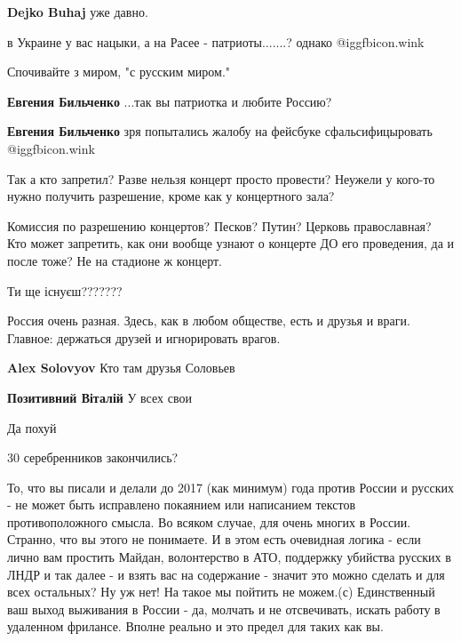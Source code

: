 \begin{itemize}
\begin{itemize}
\textbf{Dejko Buhaj} уже давно.

в Украине у вас нацыки, а на Расее - патриоты.......? однако  @igg{fbicon.wink} 

Спочивайте з миром, "с русским миром."

\textbf{Евгения Бильченко} ...так вы патриотка и любите Россию?

\textbf{Евгения Бильченко} зря попытались жалобу на фейсбуке сфальсифицыровать  @igg{fbicon.wink} 

Так а кто запретил? Разве нельзя концерт просто провести? Неужели у кого-то нужно получить разрешение, кроме как у концертного зала?

Комиссия по разрешению концертов? Песков? Путин? Церковь православная? Кто может запретить, как они вообще узнают о концерте ДО его проведения, да и после тоже? Не на стадионе ж концерт.
\end{itemize} %

Ти ще існуєш???????

Россия очень разная. Здесь, как в любом обществе, есть и друзья и враги. Главное: держаться друзей и игнорировать врагов.

\begin{itemize} %
\textbf{Alex Solovyov} Кто там друзья Соловьев

\textbf{Позитивний Віталій} У всех свои
\end{itemize} %

Да похуй

30 серебренников закончились?


То, что вы писали и делали до 2017 (как минимум) года против России и русских -
не может быть исправлено покаянием или написанием текстов противоположного
смысла. Во всяком случае, для очень многих в России. Странно, что вы этого не
понимаете. И в этом есть очевидная логика - если лично вам простить Майдан,
волонтерство в АТО, поддержку убийства русских в ЛНДР и так далее - и взять вас
на содержание - значит это можно сделать и для всех остальных? Ну уж нет! На
такое мы пойтить не можем.(с) Единственный ваш выход выживания в России - да,
молчать и не отсвечивать, искать работу в удаленном фрилансе. Вполне реально и
это предел для таких как вы.


\end{itemize}
